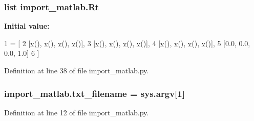 \subsubsection[{\texorpdfstring{Rt}{Rt}}]{\setlength{\rightskip}{0pt plus 5cm}list import\+\_\+matlab.\+Rt}\hypertarget{namespaceimport__matlab_af35611fc15f922f0c3fde1ffb49832cd}{}\label{namespaceimport__matlab_af35611fc15f922f0c3fde1ffb49832cd}
{\bfseries Initial value\+:}
\begin{DoxyCode}
1 = [
2         [\hyperlink{namespaceimport__matlab_a43c35054e148e026c772896fcf0ee506}{v}(), \hyperlink{namespaceimport__matlab_a43c35054e148e026c772896fcf0ee506}{v}(), \hyperlink{namespaceimport__matlab_a43c35054e148e026c772896fcf0ee506}{v}(), \hyperlink{namespaceimport__matlab_a43c35054e148e026c772896fcf0ee506}{v}()],
3         [\hyperlink{namespaceimport__matlab_a43c35054e148e026c772896fcf0ee506}{v}(), \hyperlink{namespaceimport__matlab_a43c35054e148e026c772896fcf0ee506}{v}(), \hyperlink{namespaceimport__matlab_a43c35054e148e026c772896fcf0ee506}{v}(), \hyperlink{namespaceimport__matlab_a43c35054e148e026c772896fcf0ee506}{v}()],
4         [\hyperlink{namespaceimport__matlab_a43c35054e148e026c772896fcf0ee506}{v}(), \hyperlink{namespaceimport__matlab_a43c35054e148e026c772896fcf0ee506}{v}(), \hyperlink{namespaceimport__matlab_a43c35054e148e026c772896fcf0ee506}{v}(), \hyperlink{namespaceimport__matlab_a43c35054e148e026c772896fcf0ee506}{v}()],
5         [0.0, 0.0, 0.0, 1.0]
6     ]
\end{DoxyCode}


Definition at line 38 of file import\+\_\+matlab.\+py.

\subsubsection[{\texorpdfstring{txt\+\_\+filename}{txt_filename}}]{\setlength{\rightskip}{0pt plus 5cm}import\+\_\+matlab.\+txt\+\_\+filename = sys.\+argv\mbox{[}1\mbox{]}}\hypertarget{namespaceimport__matlab_a759337ff99df77b7e83b057fce792564}{}\label{namespaceimport__matlab_a759337ff99df77b7e83b057fce792564}


Definition at line 12 of file import\+\_\+matlab.\+py.

